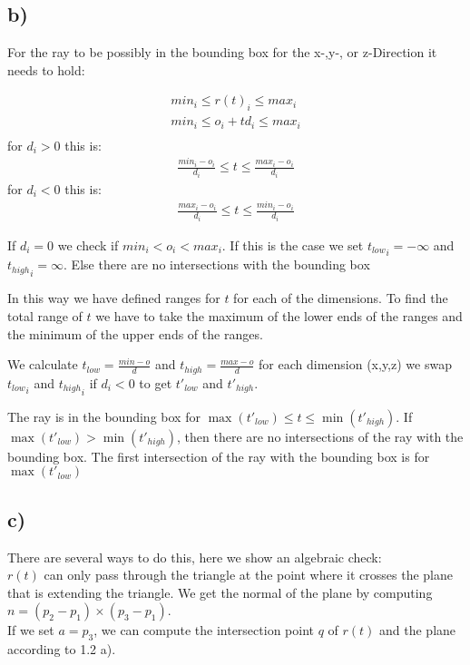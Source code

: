 \documentclass[a4paper]{scrartcl}
\begin{document}
    \subsection*{b)}
        For the ray to be possibly in the bounding box for the x-,y-, or z-Direction it needs to hold:
            
        \begin{align*}{}
          min_i \leq r(t)_i \leq max_i \\
          min_i \leq o_i + t d_i \leq max_i \\
        \end{align*}
        for $d_i > 0$ this is:
        \begin{align*}
          \frac{min_i - o_i}{d_i} \leq t \leq \frac{max_i - o_i}{d_i}          
        \end{align*} 
        for $d_i < 0$ this is:
        \begin{align*}
          \frac{max_i - o_i}{d_i} \leq t \leq \frac{min_i - o_i}{d_i}          
        \end{align*} 

        If $d_i = 0$ we check if $min_i < o_i < max_i$. If this is the case we set 
        ${t_{low}}_i = -\infty$ and ${t_{high}}_i = \infty$. Else there are no intersections with the bounding box
        
        In this way we have defined ranges for $t$ for each of the dimensions. 
        To find the total range of $t$ we have to take the maximum of the lower ends of the 
        ranges and the minimum of the upper ends of the ranges.

        We calculate $t_{low} = \frac{min - o}{d}$ and $t_{high} = \frac{max - o}{d}$
        for each dimension (x,y,z) we swap ${t_{low}}_i$ and ${t_{high}}_i$ if $d_i < 0$ to get $t'_{low}$ and $t'_{high}$.
        
        The ray is in the bounding box for $\max(t'_{low}) \leq t \leq \min(t'_{high})$. If $\max(t'_{low}) > \min(t'_{high})$, then
        there are no intersections of the ray with the bounding box. The first intersection of the ray with the bounding box is for 
        $\max(t'_{low})$


    \subsection*{c)}
        There are several ways to do this, here we show an algebraic check:\\
        $r(t)$ can only pass through the triangle at the point where it crosses 
        the plane that is extending the triangle.
        We get the normal of the plane
        by computing $n=(p_2 - p_1)\times (p_3 - p_1)$.\\
        If we set $a=p_3$, we can compute the intersection point $q$ of $r(t)$
        and the plane according to 1.2 a). 
        
\end{document}
